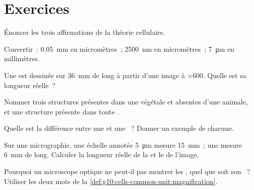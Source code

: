 \section{Exercices}

\begin{exercise}[$\star$]\label{exo:g10:cells-common-unit:1}
Énoncer les trois affirmations de la théorie cellulaire.
\end{exercise}

\begin{exercise}[$\star$]\label{exo:g10:cells-common-unit:2}
Convertir~: \qty{0.05}{mm} en micromètres~; \qty{2500}{nm} en
micromètres~; \qty{7}{\micro m} en millimètres.
\end{exercise}

\begin{exercise}[$\star$]\label{exo:g10:cells-common-unit:3}
Une  est dessinée sur \qty{36}{mm} de long à partir d'une image
à $\times 600$. Quelle est sa longueur réelle~?
\end{exercise}

\begin{exercise}[$\star$]\label{exo:g10:cells-common-unit:4}
Nommer trois structures présentes dans une  végétale et absentes
d'une  animale, et une structure présente dans toute .
\end{exercise}

\begin{exercise}[$\star$]\label{exo:g10:cells-common-unit:5}
Quelle est la différence entre une  et une ~? Donner un exemple de chacune.
\end{exercise}

\begin{exercise}[$\star\star$]\label{exo:g10:cells-common-unit:6}
Sur une micrographie, une échelle annotée \qty{5}{\micro m} mesure
\qty{15}{mm}~; une  mesure \qty{6}{mm} de long. Calculer la
longueur réelle de la  et le  de l'image.
\end{exercise}

\begin{exercise}[$\star\star$]\label{exo:g10:cells-common-unit:7}
Pourquoi un microscope optique ne peut-il pas montrer les ,
quel que soit son ~? Utiliser les deux mots de la
\cref{def:g10:cells-common-unit:magnification}.
\end{exercise}

